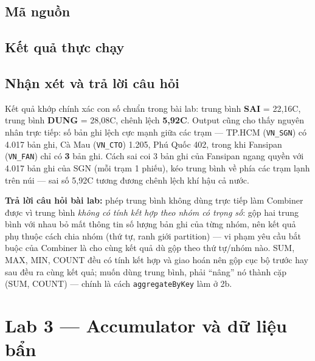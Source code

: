 \documentclass[12pt,a4paper,oneside]{article}
\begin{document}
\subsection{Mã nguồn}



\subsection{Kết quả thực chạy}



\subsection{Nhận xét và trả lời câu hỏi}

Kết quả khớp chính xác con số chuẩn trong bài lab: trung bình \textbf{SAI} = 22,16\textdegree C, trung bình \textbf{DUNG} = 28,08\textdegree C, chênh lệch \textbf{5,92\textdegree C}. Output cũng cho thấy nguyên nhân trực tiếp: số bản ghi lệch cực mạnh giữa các trạm --- TP.HCM (\texttt{VN\_SGN}) có 4.017 bản ghi, Cà Mau (\texttt{VN\_CTO}) 1.205, Phú Quốc 402, trong khi Fansipan (\texttt{VN\_FAN}) chỉ có \textbf{3} bản ghi. Cách sai coi 3 bản ghi của Fansipan ngang quyền với 4.017 bản ghi của SGN (mỗi trạm 1 phiếu), kéo trung bình về phía các trạm lạnh trên núi --- sai số 5,92\textdegree C tương đương chênh lệch khí hậu cả nước.

\textbf{Trả lời câu hỏi bài lab:} phép trung bình không dùng trực tiếp làm Combiner được vì trung bình \emph{không có tính kết hợp theo nhóm có trọng số}: gộp hai trung bình với nhau bỏ mất thông tin số lượng bản ghi của từng nhóm, nên kết quả phụ thuộc cách chia nhóm (thứ tự, ranh giới partition) --- vi phạm yêu cầu bắt buộc của Combiner là cho cùng kết quả dù gộp theo thứ tự/nhóm nào. SUM, MAX, MIN, COUNT đều có tính kết hợp và giao hoán nên gộp cục bộ trước hay sau đều ra cùng kết quả; muốn dùng trung bình, phải ``nâng'' nó thành cặp (SUM, COUNT) --- chính là cách \texttt{aggregateByKey} làm ở 2b.

\section{Lab 3 --- Accumulator và dữ liệu bẩn}
\label{sec:lab3}
\end{document}
